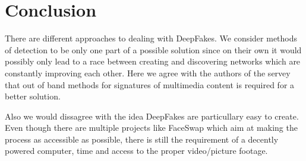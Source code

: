 \section{Conclusion}
There are different approaches to dealing with DeepFakes.
We consider methods of detection to be only one part of a possible solution since
on their own it would possibly only lead to a race between creating and discovering
networks which are constantly improving each other.
Here we agree with the authors of the servey that out of band methods for signatures of 
multimedia content is required for a better solution.

Also we would dissagree with the idea DeepFakes are particullary easy to create.
Even though there are multiple projects like FaceSwap which aim at making the
process as accessible as possible, there is still the requirement of a decently powered
computer, time and access to the proper video/picture footage.